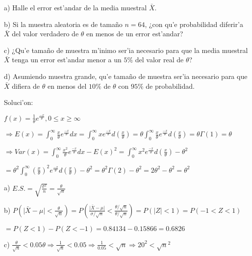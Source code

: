 \documentclass{article}
\providecommand{\abs}[1]{\lvert#1\rvert}
\begin{document}
a) Halle el error est'andar de la media muestral $\bar{X}$.

b) Si la muestra aleatoria es de tamaño $n = 64$, ¿con qu'e probabilidad diferir'a $\bar{X}$ del valor verdadero de $\theta$ en menos de un error est'andar?

c) ¿Qu'e tamaño de muestra m'inimo ser'ia necesario para que la media muestral $\bar{X}$ tenga un error est'andar menor a un $5\%$ del valor real de $\theta$?

d) Asumiendo muestra grande, qu'e tamaño de muestra ser'ia necesario para que $\bar{X}$ difiera de $\theta$ en menos del $10\%$ de $\theta$ con $95\%$ de probabilidad.
\vspace{4mm}

Soluci'on:
\vspace{4mm}

$f(x) = \frac{1}{\theta}e^{\frac{-x}{\theta}},  0\leq x \geq\infty$
\vspace{4mm}

$\Longrightarrow E(x) = \int_0^\infty \frac{x}{\theta}e^{\frac{-x}{\theta}}dx = \int_0^\infty xe^{\frac{-x}{\theta}}d(\frac{x}{\theta}) = \theta\int_0^\infty \frac{x}{\theta}e^{\frac{-x}{\theta}}d(\frac{x}{\theta}) = \theta\Gamma(1) = \theta$
\vspace{3mm}

$\Longrightarrow Var(x) = \int_0^\infty \frac{x^{2}}{\theta}e^{\frac{-x}{\theta}}dx - E(x)^{2}= \int_0^\infty x^{2}e^{\frac{-x}{\theta}}d(\frac{x}{\theta}) - \theta^{2}$
\vspace{3mm}

$= \theta^{2}\int_0^\infty (\frac{x}{\theta})^{2}e^{\frac{-x}{\theta}}d(\frac{x}{\theta}) - \theta^{2} = \theta^{2}\Gamma(2) - \theta^{2} = 2\theta^{2} - \theta^{2} =  \theta^{2}$
\vspace{7mm}

a) 
$E.S. = \sqrt{\frac{\sigma^{2}}{n}} = \frac{\theta}{\sqrt{n}}$
\vspace{5mm}

b)
$P(\abs{\bar{X}-\mu}<\frac{\theta}{\sqrt{n}}) =  P(\frac{\abs{\bar{X}-\mu}}{\sigma/\sqrt{n}}<\frac{\theta/\sqrt{n}}{\theta/\sqrt{n}}) = P(\abs{Z}<1) = P(-1<Z<1)$
\vspace{1mm}

$= P(Z<1)-P(Z<-1) = 0.84134-0.15866 = 0.6826$
\vspace{7mm}

c)
$\frac{\theta}{\sqrt{n}}<0.05\theta \Longrightarrow \frac{1}{\sqrt{n}}<0.05 \Longrightarrow \frac{1}{0.05}<\sqrt{n} \Longrightarrow 20^{2}<\sqrt{n}^{2} $
\vspace{3mm}
\end{document}
